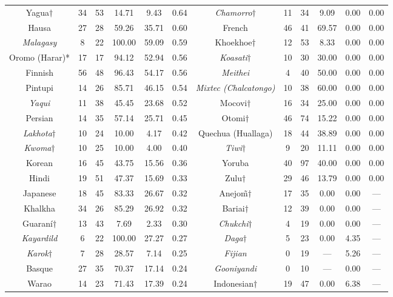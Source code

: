 \begin{tabular}{cccccccccccc}
Yagua$\dagger$ & 34 & 53 & 14.71 & 9.43 & 0.64 & \emph{Chamorro}$\dagger$ & 11 & 34 & 9.09 & 0.00 & 0.00 \\
Hausa & 27 & 28 & 59.26 & 35.71 & 0.60 & French & 46 & 41 & 69.57 & 0.00 & 0.00 \\
\emph{Malagasy} & 8 & 22 & 100.00 & 59.09 & 0.59 & Khoekhoe$\dagger$ & 12 & 53 & 8.33 & 0.00 & 0.00 \\
Oromo (Harar)* & 17 & 17 & 94.12 & 52.94 & 0.56 & \emph{Koasati}$\dagger$ & 10 & 30 & 30.00 & 0.00 & 0.00 \\
Finnish & 56 & 48 & 96.43 & 54.17 & 0.56 & \emph{Meithei} & 4 & 40 & 50.00 & 0.00 & 0.00 \\
Pintupi & 14 & 26 & 85.71 & 46.15 & 0.54 & \emph{Mixtec (Chalcatongo)} & 10 & 38 & 60.00 & 0.00 & 0.00 \\
\emph{Yaqui} & 11 & 38 & 45.45 & 23.68 & 0.52 & Mocovi$\dagger$ & 16 & 34 & 25.00 & 0.00 & 0.00 \\
Persian & 14 & 35 & 57.14 & 25.71 & 0.45 & Otomi$\dagger$ & 46 & 74 & 15.22 & 0.00 & 0.00 \\
\emph{Lakhota}$\dagger$ & 10 & 24 & 10.00 & 4.17 & 0.42 & Quechua (Huallaga) & 18 & 44 & 38.89 & 0.00 & 0.00 \\
\emph{Kwoma}$\dagger$ & 10 & 25 & 10.00 & 4.00 & 0.40 & \emph{Tiwi}$\dagger$ & 9 & 20 & 11.11 & 0.00 & 0.00 \\
Korean & 16 & 45 & 43.75 & 15.56 & 0.36 & Yoruba & 40 & 97 & 40.00 & 0.00 & 0.00 \\
Hindi & 19 & 51 & 47.37 & 15.69 & 0.33 & Zulu$\dagger$ & 29 & 46 & 13.79 & 0.00 & 0.00 \\
Japanese & 18 & 45 & 83.33 & 26.67 & 0.32 & Anejo\~{m}$\dagger$ & 17 & 35 & 0.00 & 0.00 & --- \\
Khalkha & 34 & 26 & 85.29 & 26.92 & 0.32 & Bariai$\dagger$ & 12 & 39 & 0.00 & 0.00 & --- \\
Guaraní$\dagger$ & 13 & 43 & 7.69 & 2.33 & 0.30 & \emph{Chukchi}$\dagger$ & 4 & 19 & 0.00 & 0.00 & --- \\
\emph{Kayardild} & 6 & 22 & 100.00 & 27.27 & 0.27 & \emph{Daga}$\dagger$ & 5 & 23 & 0.00 & 4.35 & --- \\
\emph{Karok}$\dagger$ & 7 & 28 & 28.57 & 7.14 & 0.25 & \emph{Fijian} & 0 & 19 & --- & 5.26 & --- \\
Basque & 27 & 35 & 70.37 & 17.14 & 0.24 & \emph{Gooniyandi} & 0 & 10 & --- & 0.00 & --- \\
Warao & 14 & 23 & 71.43 & 17.39 & 0.24 & Indonesian$\dagger$ & 19 & 47 & 0.00 & 6.38 & --- \\

\end{tabular}
